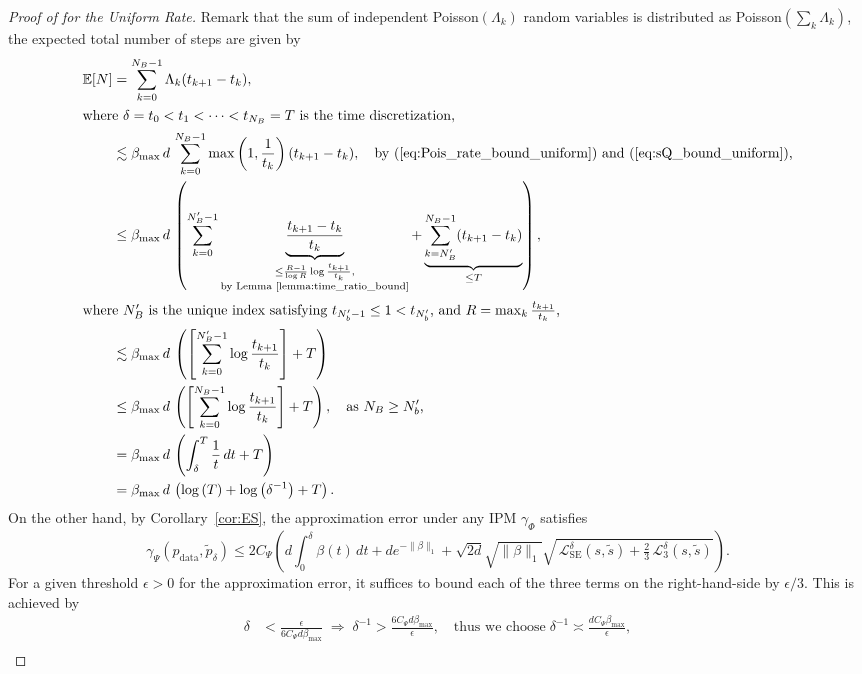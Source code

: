 \documentclass{article} %
\def\eqref#1{equation~\ref{#1}}
\newcommand{\LSE}{\mathcal{L}_{\mathrm{SE}}}
\renewcommand{\eqref}[1]{\textup{(\ref{#1})}}
\newcommand{\LThree}{\mathcal{L}_{3}}
\newcommand{\betamax}{\beta_{\mathrm{max}}}
\begin{document}
\begin{proof}[Proof of  for the Uniform Rate]
    Remark that the sum of independent Poisson$(\Lambda_k)$ random variables is distributed as Poisson$(\sum_k \Lambda_k)$, the expected total number of steps are given by
    \begin{align}
        \mathbb{E}[N] &= \sum_{k=0}^{N_B-1} \Lambda_k (t_{k+1}-t_k), \nonumber \\
        \intertext{where $\delta =t_0 <t_1 < \cdots <t_{N_B}=T$ is the time discretization,}
        & \lesssim \betamax \,d\, \sum_{k=0}^{N_B-1}  \max \left(1, \frac{1}{t_k} \right) (t_{k+1}-t_k), \quad \text{by \eqref{eq:Pois_rate_bound_uniform} and \eqref{eq:sQ_bound_uniform},} \nonumber\\
        &\leq \betamax \,d\, \left( \sum_{k=0}^{N_B'-1} \underbrace{\frac{t_{k+1}-t_k}{t_k}}_{\substack{\leq \frac{R-1}{\log R} \log \frac{t_{k+1}}{t_k}, \\ \text{by Lemma~\ref{lemma:time_ratio_bound}}}} + \underbrace{\sum_{k=N_B'}^{N_B-1} (t_{k+1}-t_k)}_{\leq T} \right), \nonumber\\
        \intertext{where $N_B'$ is the unique index satisfying $t_{N_b'-1} \leq 1 <t_{N_b'} $, and $R=\max_k \frac{t_{k+1}}{t_k}$,}
        &\lesssim \betamax \, d \, \left( \left[\sum_{k=0}^{N_B'-1} \log \frac{t_{k+1}}{t_k} \right] + T \right) \nonumber\\
        &\leq \betamax \, d \, \left( \left[\sum_{k=0}^{N_B-1} \log \frac{t_{k+1}}{t_k} \right] + T \right), \quad \text{as $N_B \geq N_b'$,} \nonumber\\
        &= \betamax \, d \,  \left( \int_\delta^T \frac{1}{t} \, dt + T \right) \nonumber\\
        &= \betamax \, d \,  \left( \log \left( T\right) + \log \left( \delta^{-1} \right) + T \right). \label{eq:expected_step_uniform}
    \end{align}
    On the other hand, by Corollary~\ref{cor:ES}, the approximation error under any IPM $\gamma_\Phi$ satisfies
    \[
    \gamma_\Psi(p_{\mathrm{data}}, \tilde{p}_\delta)  \leq 2 C_\Psi \left( d {\textstyle \int_0^\delta \beta(t)\,dt } + d e^{-\| \beta \|_1}  +  \sqrt{2d} \sqrt{\|\beta \|_1}  \sqrt{ \,\LSE^\delta(s, \tilde{s}) + \tfrac{2}{3}\,\LThree^\delta(s, \tilde{s}) } \right).
    \]
    For a given threshold $\epsilon>0$ for the approximation error, it suffices to bound each of the three terms on the right-hand-side by $\epsilon/3$. This is achieved by
    \begin{align}
        \delta &< \frac{\epsilon}{6 C_\Psi d \betamax} \;\Rightarrow \; \delta^{-1} > \frac{6 C_\Psi d \betamax}{\epsilon} , \quad \text{thus we choose} \; \delta^{-1} \asymp \frac{d C_\Psi \betamax }{\epsilon},\label{eq:uniform_delta_bound}\\

\end{align}
\end{proof}
\end{document}
